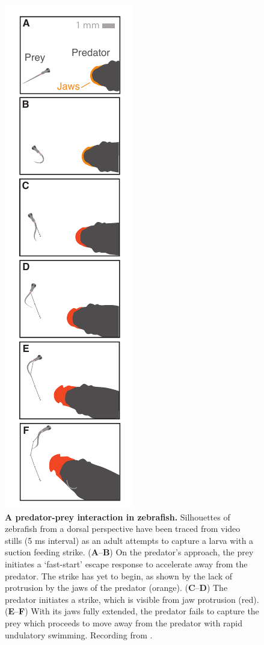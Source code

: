 \documentclass[12pt]{article}
\begin{document}
\pagebreak
\begin{figure}	
\includegraphics[width=.35\textwidth]{Fig_01.pdf}
\centering	
\caption{\textbf{A predator-prey interaction in zebrafish.} Silhouettes of zebrafish from a dorsal perspective have been traced from video stills (5 ms interval) as an adult attempts to capture a larva with a suction feeding strike.  
(\textbf{A}--\textbf{B}) On the predator's approach, the prey initiates a `fast-start' escape response to accelerate away from the predator. The strike has yet to begin, as shown by the lack of protrusion by the jaws of the predator (orange). 
(\textbf{C}--\textbf{D}) The predator initiates a strike, which is visible from jaw protrusion (red).
(\textbf{E}--\textbf{F}) With its jaws fully extended, the predator fails to capture the prey which proceeds to move away from the predator with rapid undulatory swimming. 
Recording from \cite{Stewart:2014cm}.}
\label{pred_prey}
\end{figure}
\end{document}
